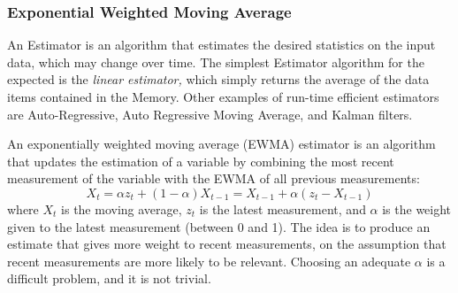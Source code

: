 \subsubsection{Exponential Weighted Moving Average}
\label{Ssewma}

An Estimator is an algorithm that estimates the desired statistics on the input data, which
may change over time. %
The simplest Estimator algorithm for the expected is the {\em linear estimator,}
which simply returns the average of the data items contained in the Memory. 
Other examples of run-time efficient estimators are 
Auto-Regressive, Auto Regressive Moving Average, and Kalman filters. 

An exponentially weighted moving average (EWMA) estimator is 
an algorithm that updates the estimation of a variable by combining the most 
recent measurement of the variable with the EWMA of all previous measurements:
$$ X_t=\alpha z_t + (1 -\alpha) X_{t-1} = X_{t-1} + \alpha (z_t -X_{t-1}) $$ 
where $X_t$ is the moving average, $z_t$ is the latest measurement, and $\alpha$
 is the weight given to the latest measurement (between 0 and 1). 
The idea is to produce an estimate that gives more weight to recent measurements, 
on the assumption that recent measurements are more likely to be relevant. 
Choosing an adequate $\alpha$ is a difficult problem, and it is not trivial.





